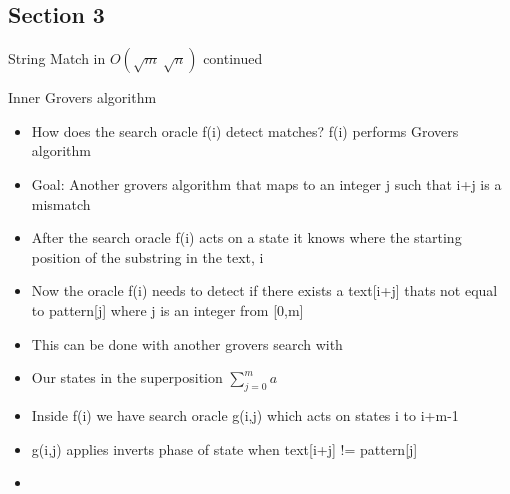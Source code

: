 \documentclass{beamer}
\begin{document}
\subsection{Section 3}
\begin{frame}{String Match in \(O(\sqrt{m}\ \sqrt{n})\) continued}
    \begin{block}{Inner Grovers algorithm}
        \begin{itemize}
            \item How does the search oracle f(i) detect matches? f(i) performs Grovers algorithm
            \item Goal: Another grovers algorithm that maps to an integer j such that i+j is a mismatch
            \item After the search oracle f(i) acts on a state it knows where the starting position of the substring in the text, i
            \item Now the oracle f(i) needs to detect if there exists a text[i+j] thats not equal to pattern[j] where j is an integer from [0,m]
            \item This can be done with another grovers search with 
            \item Our states in the superposition $\sum_{j=0}^{m} a$
            \item Inside f(i) we have search oracle g(i,j) which acts on states i to i+m-1
            \item g(i,j) applies inverts phase of state when text[i+j] != pattern[j]
            \item 
        \end{itemize}
    \end{block}
\end{frame}
\end{document}
